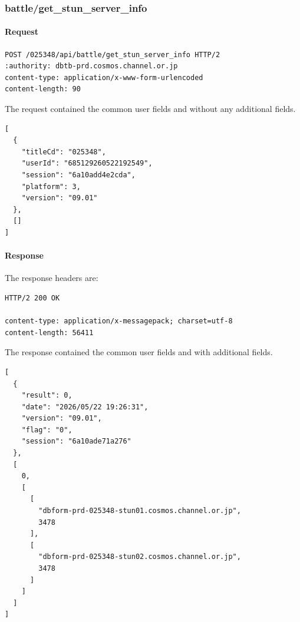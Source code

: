 \subsubsection{battle/get\_stun\_server\_info}
\label{subsec:api_battle_get_stun_server_info}

\paragraph{Request}

\begin{lstlisting}
POST /025348/api/battle/get_stun_server_info HTTP/2
:authority: dbtb-prd.cosmos.channel.or.jp
content-type: application/x-www-form-urlencoded
content-length: 90
\end{lstlisting}

The request contained the common user fields and without any additional fields.

\begin{lstlisting}
[
  {
    "titleCd": "025348",
    "userId": "685129260522192549",
    "session": "6a10add4e2cda",
    "platform": 3,
    "version": "09.01"
  },
  []
]
\end{lstlisting}

\newpage

\paragraph{Response}

The response headers are:

\begin{lstlisting}
HTTP/2 200 OK

content-type: application/x-messagepack; charset=utf-8
content-length: 56411
\end{lstlisting}

The response contained the common user fields and with additional fields.

\begin{lstlisting}
[
  {
    "result": 0,
    "date": "2026/05/22 19:26:31",
    "version": "09.01",
    "flag": "0",
    "session": "6a10ade71a276"
  },
  [
    0,
    [
      [
        "dbform-prd-025348-stun01.cosmos.channel.or.jp",
        3478
      ],
      [
        "dbform-prd-025348-stun02.cosmos.channel.or.jp",
        3478
      ]
    ]
  ]
]
\end{lstlisting}

